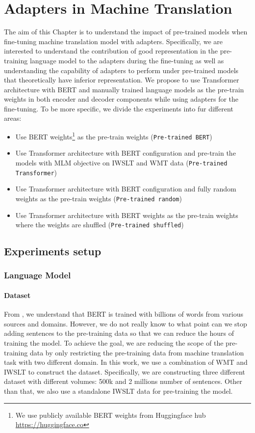 
\chapter{Adapters in Machine Translation}
\label{chap:adaptmt}
The aim of this Chapter is to understand the impact of pre-trained models when fine-tuning machine translation model with adapters. Specifically, we are interested to understand the contribution of good representation in the pre-training language model to the adapters during the fine-tuning as well as understanding the capability of adapters to perform under pre-trained models that theoretically have inferior representation. We propose to use Transformer architecture with BERT and manually trained language models as the pre-train weights in both encoder and decoder components while using adapters for the fine-tuning. To be more specific, we divide the experiments into fur different areas:
\begin{itemize}
    \item Use BERT weights\footnote{We use publicly available BERT weights from Huggingface hub \url{https://huggingface.co}} as the pre-train weights (\texttt{Pre-trained BERT})
    \item Use Transformer architecture with BERT configuration and pre-train the models with MLM objective on IWSLT and WMT data (\texttt{Pre-trained Transformer})
    \item Use Transformer architecture with BERT configuration and fully random weights as the pre-train weights (\texttt{Pre-trained random})
    \item Use Transformer architecture with BERT weights as the pre-train weights where the weights are shuffled (\texttt{Pre-trained shuffled})
\end{itemize}

\section{Experiments setup}
\subsection{Language Model}
\label{ssec:langmodel}
\subsubsection{Dataset}
From \cite{devlin2018bert}, we understand that BERT is trained with billions of words from various sources and domains. However, we do not really know to what point can we stop adding sentences to the pre-training data so that we can reduce the hours of training the model. To achieve the goal, we are reducing the scope of the pre-training data by only restricting the pre-training data from machine translation task with two different domain. In this work, we use a combination of WMT and IWSLT to construct the dataset. Specifically, we are constructing three different dataset with different volumes: 500k and 2 millions number of sentences. Other than that, we also use a standalone IWSLT data for pre-training the model.

